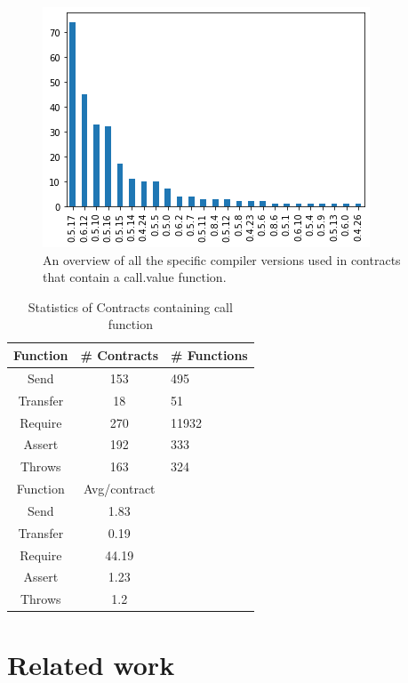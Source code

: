 \documentclass[sigconf]{acmart}
\begin{document}
\begin{figure}[h]
  \centering
  \includegraphics[width=\linewidth]{img/versions_call_v3_total.png}
  \caption{An overview of all the specific compiler versions used in contracts that contain a call.value function. }
  \label{fig:call_version}
\end{figure}



\begin{table}
  \caption{Statistics of Contracts containing call function}
  \label{tab:call}
  \begin{tabular}{ccl}
    \toprule
    Function & \# Contracts & \# Functions\\
    \midrule
    Send&153&495\\
    Transfer&18&51\\
    Require&270&11932\\
    Assert&192&333\\
    Throws&163&324\\
    \toprule
    Function & Avg/contract\\
    \midrule
    Send&1.83\\
    Transfer&0.19\\
    Require&44.19\\
    Assert&1.23\\
    Throws&1.2\\
  \bottomrule
\end{tabular}
\end{table}


\section{Related work}
\end{document}
